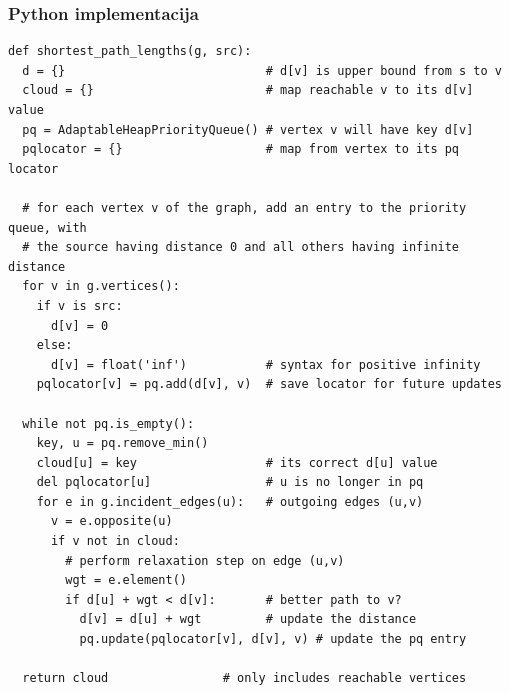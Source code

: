 \documentclass[compress,aspectratio=169]{beamer}
\begin{document}
\begin{frame}
  \frametitle{Python implementacija}
\begin{verbatim}
def shortest_path_lengths(g, src):
  d = {}                            # d[v] is upper bound from s to v
  cloud = {}                        # map reachable v to its d[v] value
  pq = AdaptableHeapPriorityQueue() # vertex v will have key d[v]
  pqlocator = {}                    # map from vertex to its pq locator

  # for each vertex v of the graph, add an entry to the priority queue, with
  # the source having distance 0 and all others having infinite distance
  for v in g.vertices():
    if v is src:
      d[v] = 0
    else:
      d[v] = float('inf')           # syntax for positive infinity
    pqlocator[v] = pq.add(d[v], v)  # save locator for future updates

  while not pq.is_empty():
    key, u = pq.remove_min()
    cloud[u] = key                  # its correct d[u] value
    del pqlocator[u]                # u is no longer in pq
    for e in g.incident_edges(u):   # outgoing edges (u,v)
      v = e.opposite(u)
      if v not in cloud:
        # perform relaxation step on edge (u,v)
        wgt = e.element()
        if d[u] + wgt < d[v]:       # better path to v?
          d[v] = d[u] + wgt         # update the distance
          pq.update(pqlocator[v], d[v], v) # update the pq entry

  return cloud                # only includes reachable vertices
\end{verbatim}
\end{frame}
\end{document}
